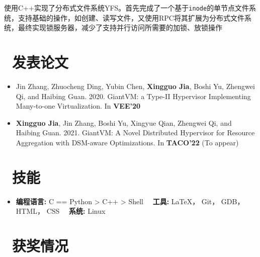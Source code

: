 \documentclass{resume}
\begin{document}
使用C++实现了分布式文件系统YFS。首先完成了一个基于\texttt{inode}的单节点文件系统，支持基础的操作，如创建、读写文件，又使用RPC将其扩展为分布式文件系统，最终实现锁服务器，减少了支持并行访问所需要的加锁、放锁操作

\section{\faGraduationCap\ 发表论文}
\begin{itemize}
\item Jin Zhang, Zhuocheng Ding, Yubin Chen, \textbf{Xingguo Jia}, Boshi Yu, Zhengwei Qi, and Haibing Guan. 2020. GiantVM: a Type-II Hypervisor Implementing Many-to-one Virtualization. In \textbf{VEE'20}
\item \textbf{Xingguo Jia}, Jin Zhang, Boshi Yu, Xingyue Qian, Zhengwei Qi, and Haibing Guan. 2021. GiantVM: A Novel Distributed Hypervisor for Resource Aggregation with DSM-aware Optimizations. In \textbf{TACO'22} (To appear)
\end{itemize}


\section{\faCogs\ 技能}
\begin{itemize}[parsep=0.5ex]
  \item \textbf{编程语言:} C == Python > C++ > Shell \ \ \textbf{工具:} \LaTeX， Git， GDB， HTML， CSS \ \ \textbf{系统:} Linux 
\end{itemize}

\section{\faHeartO\ 获奖情况}

%
%
\end{document}
